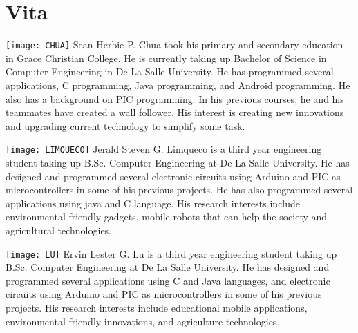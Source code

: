 \chapter{Vita}






\texttt{[image: CHUA]}
Sean Herbie P. Chua took his primary and secondary education in Grace Christian College. He is currently taking up Bachelor of Science in Computer Engineering in De La Salle University. He has programmed several applications, C programming, Java programming, and Android programming. He also has a background on PIC programming. In his previous courses, he and his teammates have created a wall follower. His interest is creating new innovations and upgrading current technology to simplify some task.

\vfill

\texttt{[image: LIMQUECO]}
Jerald Steven G. Limqueco is a third year engineering student taking up B.Sc. Computer Engineering at De La Salle University. He has designed and programmed several electronic circuits using Arduino and PIC as microcontrollers in some of his previous projects. He has also programmed several applications using java and C language. His research interests include environmental friendly gadgets, mobile robots that can help the society and agricultural technologies.

\vfill

\texttt{[image: LU]}
Ervin Lester G. Lu is a third year engineering student taking up B.Sc. Computer Engineering at De La Salle University. He has designed and programmed several applications using C and Java languages, and electronic circuits using Arduino and PIC as microcontrollers in some of his previous projects. His research interests include educational mobile applications, environmental friendly innovations, and agriculture technologies.

